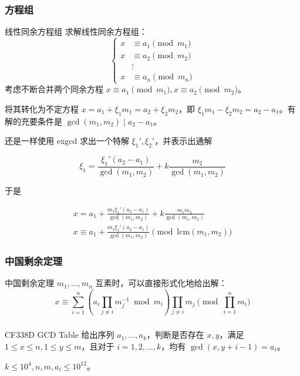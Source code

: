 \documentclass[../main.tex]{subfiles}
\begin{document}
\subsubsection{方程组}

\begin{frame}{线性同余方程组}
求解线性同余方程组：
$$
\left\{
\begin{aligned}
x&\equiv a_1\pmod{m_1}\\
x&\equiv a_2\pmod{m_2}\\
&\vdots\\
x&\equiv a_n\pmod{m_n}
\end{aligned}
\right.
$$ \pause
考虑不断合并两个同余方程 $x\equiv a_1\pmod{m_1},x\equiv a_2\pmod{m_2}$。

将其转化为不定方程 $x=a_1+\xi_1m_1=a_2+\xi_2m_2$，即 $\xi_1m_1-\xi_2m_2=a_2-a_1$。有解的充要条件是 $\gcd(m_1,m_2)\mid a_2-a_1$。
\end{frame}

\begin{frame}
还是一样使用 exgcd 求出一个特解 $\xi_1',\xi_2'$，并表示出通解

$$
\xi_1=\frac{\xi_1'(a_2-a_1)}{\gcd(m_1,m_2)}+k\frac{m_2}{\gcd(m_1,m_2)}
$$ \pause

于是

$$
\begin{aligned}
x=a_1+\frac{m_1\xi_1'(a_2-a_1)}{\gcd(m_1,m_2)}+k\frac{m_1m_2}{\gcd(m_1,m_2)} \\
x\equiv a_1+\frac{m_1\xi_1'(a_2-a_1)}{\gcd(m_1,m_2)}\pmod{\mathrm{lcm}(m_1,m_2)}
\end{aligned}
$$
\end{frame}

\subsubsection{中国剩余定理}

\begin{frame}{中国剩余定理}
$m_1,\dots,m_n$ 互素时，可以直接形式化地给出解：
$$
x\equiv \sum_{i=1}^n(a_i\prod_{j\ne i}m_j^{-1}\bmod m_i)\prod_{j\neq i}m_j\pmod{\prod_{i=1}^n m_i}
$$
\end{frame}

\subsubsection{}

\begin{frame}{CF338D GCD Table}
给出序列 $a_1,\dots,a_k$，判断是否存在 $x,y$，满足 $1\le x\le n,1\le y\le m$，且对于 $i=1,2,\dots,k$，均有 $\gcd(x,y+i-1)=a_i$。

$k\le 10^4,n,m,a_i\le 10^{12}$。
\end{frame}
\end{document}
